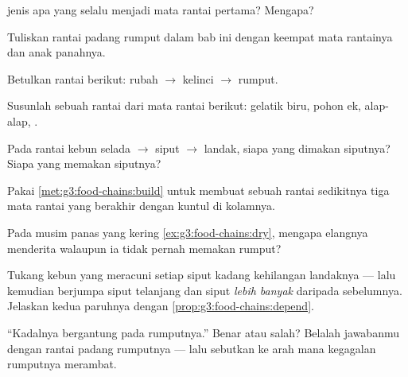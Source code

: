 \begin{exercise}[$\star$]\label{exo:g3:food-chains:2}
 jenis apa yang selalu menjadi mata rantai pertama?
Mengapa?
\end{exercise}

\begin{exercise}[$\star$]\label{exo:g3:food-chains:3}
Tuliskan rantai padang rumput dalam bab ini dengan keempat mata
rantainya dan anak panahnya.
\end{exercise}

\begin{exercise}[$\star$]\label{exo:g3:food-chains:4}
Betulkan rantai berikut: rubah $\rightarrow$ kelinci $\rightarrow$
rumput.
\end{exercise}

\begin{exercise}[$\star$]\label{exo:g3:food-chains:5}
Susunlah sebuah rantai dari mata rantai berikut:  gelatik biru,
 pohon ek, alap-alap, .
\end{exercise}

\begin{exercise}[$\star$]\label{exo:g3:food-chains:6}
Pada rantai kebun selada $\rightarrow$ siput $\rightarrow$ landak,
siapa yang dimakan siputnya? Siapa yang memakan siputnya?
\end{exercise}

\begin{exercise}[$\star$]\label{exo:g3:food-chains:7}
Pakai \cref{met:g3:food-chains:build} untuk membuat sebuah rantai
sedikitnya tiga mata rantai yang berakhir dengan kuntul di kolamnya.
\end{exercise}

\begin{exercise}[$\star$]\label{exo:g3:food-chains:8}
Pada musim panas yang kering \cref{ex:g3:food-chains:dry}, mengapa
elangnya menderita walaupun ia tidak pernah memakan rumput?
\end{exercise}

\begin{exercise}[$\star\star$]\label{exo:g3:food-chains:9}
Tukang kebun yang meracuni setiap siput kadang kehilangan landaknya
--- lalu kemudian berjumpa siput telanjang dan siput \emph{lebih
banyak} daripada sebelumnya. Jelaskan kedua paruhnya dengan
\cref{prop:g3:food-chains:depend}.
\end{exercise}

\begin{exercise}[$\star\star$]\label{exo:g3:food-chains:10}
``Kadalnya bergantung pada rumputnya.'' Benar atau salah? Belalah
jawabanmu dengan rantai padang rumputnya --- lalu sebutkan ke arah
mana kegagalan rumputnya merambat.
\end{exercise}
